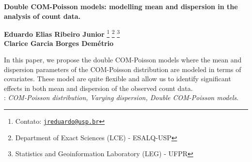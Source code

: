 \documentclass[12pt, a4paper]{article}
\begin{document}
\onehalfspacing

\begin{center}
  \textbf{
    \Large{Double COM-Poisson models: modelling mean and dispersion in
      the analysis of count data.}
  } \\[1em]
\end{center}

\begin{flushright}
  {\bf Eduardo Elias Ribeiro Junior}
  \footnote[$\dagger$]{Contato:
    \href{mailto:jreduardo@usp.br}{\tt jreduardo@usp.br}}
  \footnote[1]{Department of Exact Sciences (LCE) - ESALQ-USP}
  \footnote[2]{Statistics and Geoinformation Laboratory (LEG) -
    UFPR}\\
  {\bf Clarice Garcia Borges Demétrio} \footnotemark[1]
\end{flushright}

\vspace*{0.5cm}

\noindent In this paper, we propose the double COM-Poisson models where
the mean and dispersion parameters of the COM-Poisson distribution are
modeled in terms of covariates. These model are quite flexible and allow
us to identify significant effects in both mean and dispersion of the
observed count data.\\

:
{\it COM-Poisson distribution, Varying dispersion,
     Double COM-Poisson models}.\\
\end{document}
